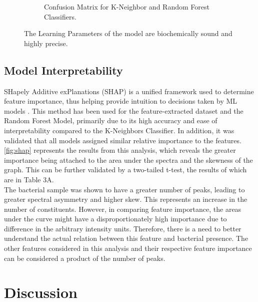 \begin{figure}[htbp]
\begin{subfigure}[b]{0.48\textwidth}
        \caption{Confusion Matrix for K-Neighbor and Random Forest Classifiers.}
        \label{fig:cfbest}
    \end{subfigure}
    \caption{The Learning Parameters of the model are biochemically sound and highly precise.}
    \label{fig:shap_and_cf}
\end{figure}


\subsection{Model Interpretability}

SHapely Additive exPlanations (SHAP) is a unified framework used to determine feature importance, thus helping provide intuition to decisions taken by ML models \cite{LundbergLee2017_SHAP}. This method has been used for the feature-extracted dataset and the Random Forest Model, primarily due to its high accuracy and ease of interpretability compared to the K-Neighbors Classifier. In addition, it was validated that all models assigned similar relative importance to the features. \autoref{fig:shap} represents the results from this analysis, which reveals the greater importance being attached to the area under the spectra and the skewness of the graph. This can be further validated by a two-tailed t-test, the results of which are in Table 3A. \\

\noindent The bacterial sample was shown to have a greater number of peaks, leading to greater spectral asymmetry and higher skew. This represents an increase in the number of constituents. However, in comparing feature importance, the areas under the curve might have a disproportionately high importance due to difference in the arbitrary intensity units. Therefore, there is a need to better understand the actual relation between this feature and bacterial presence. The other features considered in this analysis and their respective feature importance can be considered a product of the number of peaks. 

\section{Discussion}

